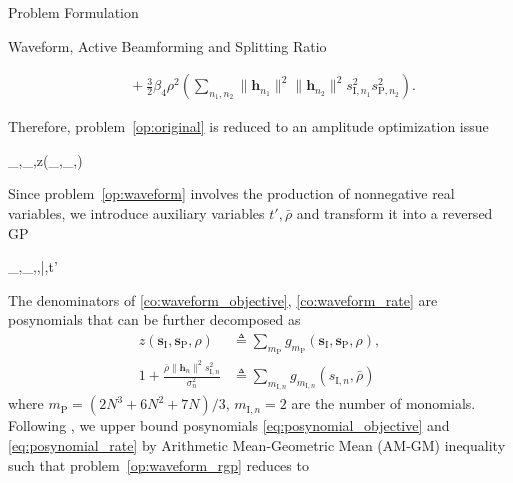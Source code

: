 \documentclass[journal]{IEEEtran}
\begin{document}
\begin{section}{Problem Formulation}
\begin{subsection}{Waveform, Active Beamforming and Splitting Ratio}
\begin{figure*}[!b]
\begin{align}
					& \quad + \frac{3}{2}{\beta_4}{\rho^2} \left( \sum_{n_1,n_2} \lVert{\boldsymbol{h}_{n_1}}\rVert^2 \lVert{\boldsymbol{h}_{n_2}}\rVert^2 s_{\mathrm{I},{n_1}}^2 s_{\mathrm{P},{n_2}}^2 \right).\label{eq:z_waveform}
				\end{align}
			\end{figure*}%
			Therefore, problem~\eqref{op:original} is reduced to an amplitude optimization issue
			\begin{maxi!}
				{_{},_,\rho}{z(_{},_,\rho)}{\label{op:waveform}}{}
			\end{maxi!}
			Since problem~\eqref{op:waveform} involves the production of nonnegative real variables, we introduce auxiliary variables $t',\bar{\rho}$ and transform it into a reversed GP
			\begin{mini!}
				{_{},_,\rho,\bar{\rho},t'}{}{\label{op:waveform_rgp}}{}
				\label{co:waveform_power}
				\label{co:waveform_objective}
				\label{co:waveform_rate}
			\end{mini!}
			The denominators of \eqref{co:waveform_objective}, \eqref{co:waveform_rate} are posynomials \cite{Boyd2007} that can be further decomposed as
			\begin{align}
				z(\boldsymbol{s}_{\mathrm{I}},\boldsymbol{s}_\mathrm{P},\rho) &\triangleq \sum_{m_\mathrm{P}}{g_{m_\mathrm{P}}(\boldsymbol{s}_{\mathrm{I}},\boldsymbol{s}_\mathrm{P},\rho)}\label{eq:posynomial_objective},\\
				1+\frac{\bar{\rho}\lVert{\boldsymbol{h}_n}\rVert^2 s_{\mathrm{I},n}^2}{\sigma_n^2} &\triangleq \sum_{m_{\mathrm{I},n}}g_{m_{\mathrm{I},n}}(s_{\mathrm{I},n},\bar{\rho})\label{eq:posynomial_rate}
			\end{align}
			where $m_\mathrm{P}=(2N^3+6N^2+7N)/3$, $m_{\mathrm{I},n}=2$ are the number of monomials. Following \cite{Chiang2005}, we upper bound posynomials \eqref{eq:posynomial_objective} and \eqref{eq:posynomial_rate} by Arithmetic Mean-Geometric Mean (AM-GM) inequality such that problem~\eqref{op:waveform_rgp} reduces to

\end{subsection}
\end{section}
\end{document}
